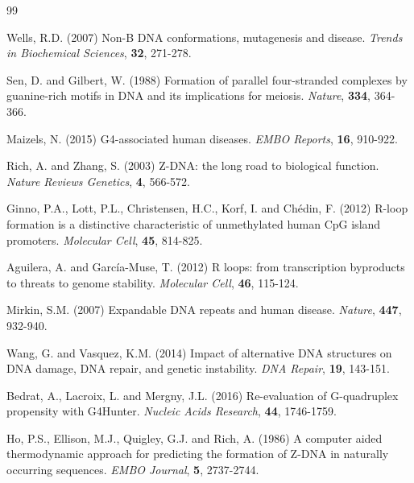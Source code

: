 \documentclass[twocolumn,letterpaper]{article}
\begin{document}
\begin{thebibliography}{99}

Wells, R.D. (2007) Non-B DNA conformations, mutagenesis and disease. \textit{Trends in Biochemical Sciences}, \textbf{32}, 271-278.

Sen, D. and Gilbert, W. (1988) Formation of parallel four-stranded complexes by guanine-rich motifs in DNA and its implications for meiosis. \textit{Nature}, \textbf{334}, 364-366.

Maizels, N. (2015) G4-associated human diseases. \textit{EMBO Reports}, \textbf{16}, 910-922.

Rich, A. and Zhang, S. (2003) Z-DNA: the long road to biological function. \textit{Nature Reviews Genetics}, \textbf{4}, 566-572.

Ginno, P.A., Lott, P.L., Christensen, H.C., Korf, I. and Chédin, F. (2012) R-loop formation is a distinctive characteristic of unmethylated human CpG island promoters. \textit{Molecular Cell}, \textbf{45}, 814-825.

Aguilera, A. and García-Muse, T. (2012) R loops: from transcription byproducts to threats to genome stability. \textit{Molecular Cell}, \textbf{46}, 115-124.

Mirkin, S.M. (2007) Expandable DNA repeats and human disease. \textit{Nature}, \textbf{447}, 932-940.

Wang, G. and Vasquez, K.M. (2014) Impact of alternative DNA structures on DNA damage, DNA repair, and genetic instability. \textit{DNA Repair}, \textbf{19}, 143-151.

Bedrat, A., Lacroix, L. and Mergny, J.L. (2016) Re-evaluation of G-quadruplex propensity with G4Hunter. \textit{Nucleic Acids Research}, \textbf{44}, 1746-1759.

Ho, P.S., Ellison, M.J., Quigley, G.J. and Rich, A. (1986) A computer aided thermodynamic approach for predicting the formation of Z-DNA in naturally occurring sequences. \textit{EMBO Journal}, \textbf{5}, 2737-2744.

\end{thebibliography}
\end{document}
